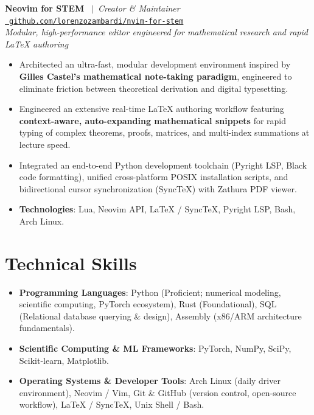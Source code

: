 \documentclass[10pt,a4paper]{article}
\begin{document}
\vspace{6pt}
\noindent
\textbf{Neovim for STEM} \ $\vert$\ \textit{Creator \& Maintainer} \hfill \href{https://github.com/lorenzozambardi/nvim-for-stem}{\faGithub\ \texttt{github.com/lorenzozambardi/nvim-for-stem}} \\
\textit{Modular, high-performance editor engineered for mathematical research and rapid LaTeX authoring}
\begin{itemize}
    \item Architected an ultra-fast, modular development environment inspired by \textbf{Gilles Castel's mathematical note-taking paradigm}, engineered to eliminate friction between theoretical derivation and digital typesetting.
    \item Engineered an extensive real-time LaTeX authoring workflow featuring \textbf{context-aware, auto-expanding mathematical snippets} for rapid typing of complex theorems, proofs, matrices, and multi-index summations at lecture speed.
    \item Integrated an end-to-end Python development toolchain (Pyright LSP, Black code formatting), unified cross-platform POSIX installation scripts, and bidirectional cursor synchronization (SyncTeX) with Zathura PDF viewer.
    \item \textbf{Technologies}: Lua, Neovim API, LaTeX / SyncTeX, Pyright LSP, Bash, Arch Linux.
\end{itemize}

\section{Technical Skills}

\begin{itemize}
    \item \textbf{Programming Languages}: Python (Proficient; numerical modeling, scientific computing, PyTorch ecosystem), Rust (Foundational), SQL (Relational database querying \& design), Assembly (x86/ARM architecture fundamentals).
    \item \textbf{Scientific Computing \& ML Frameworks}: PyTorch, NumPy, SciPy, Scikit-learn, Matplotlib.
    \item \textbf{Operating Systems \& Developer Tools}: Arch Linux (daily driver environment), Neovim / Vim, Git \& GitHub (version control, open-source workflow), LaTeX / SyncTeX, Unix Shell / Bash.
\end{itemize}
\end{document}
